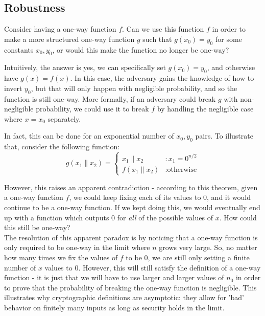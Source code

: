 \subsection{Robustness}
Consider having a one-way function $f$.  Can we use this function $f$ in order to make a more structured one-way function $g$ such that $g(x_0) = y_0$ for some constants $x_0, y_0$, or would this make the function no longer be one-way? 

Intuitively, the answer is yes, we can specifically set $g(x_0) = y_0$, and otherwise have $g(x) = f(x)$.  In this case, the adversary gains the knowledge of how to invert $y_0$, but that will only happen with negligible probability, and so the function is still one-way. More formally, if an adversary could break $g$ with non-negligible probability, we could use it to break $f$ by handling the negligible case where $x = x_0$ separately.


In fact, this can be done for an exponential number of $x_0, y_0$ pairs. To illustrate that, consider the following function:
\[
  g(x_1\|x_2) = \left\{ \begin{array}{ll} x_1\|x_2 & : x_1 = 0^{n/2} \\ f(x_1\|x_2) & : \text{otherwise} \end{array} \right.
\]

However, this raises an apparent contradiction - according to this theorem, given a one-way function $f$, we could keep fixing each of its values to $0$, and it would continue to be a one-way function.  If we kept doing this, we would eventually end up with a function which outputs 0 for {\em all} of the possible values of $x$.  How could this still be one-way?\\

The resolution of this apparent paradox is by noticing that a one-way function is only required to be one-way in the limit where $n$ grows very large.  So, no matter how many times we fix the values of $f$ to be 0, we are still only setting a finite number of $x$ values to 0.  However, this will still satisfy the definition of a one-way function - it is just that we will have to use larger and larger values of $n_0$ in order to prove that the probability of breaking the one-way function is negligible. This illustrates why cryptographic definitions are asymptotic: they allow for 'bad' behavior on finitely many inputs as long as security holds in the limit.

